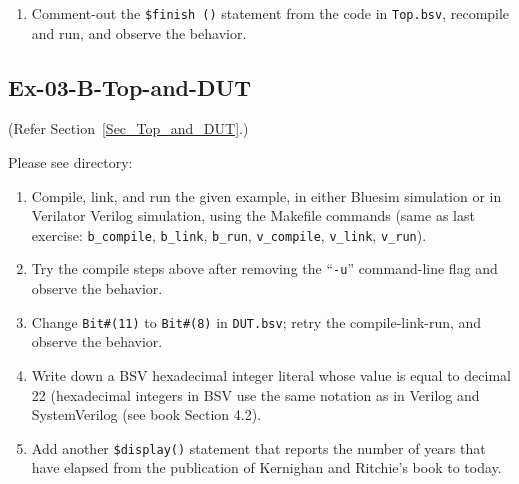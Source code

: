 \begin{enumerate}
    For each of the above ``\verb|make|'' commands, make sure you
    understand what it does, by examining the Makefile, or using the
    \verb|--dry-run| flag like this, or examining the terminal when
    you actually run 'make'.

    \begin{verbatim}
    $ make <target> --dry-run
    \end{verbatim}

    You can also type ``\verb|make b_all|'' to or ``\verb|make v_all|''
    to perform all three actions: compile, link and run (simulate).

    Once you understand these actions, you should be able to create
    your own Makefiles for bsc and Verilator.

  \item Comment-out the \verb|$finish ()| statement from the code in
    \verb|Top.bsv|, recompile and run, and observe the behavior.

\end{enumerate}


\subsection*{Ex-03-B-Top-and-DUT}
\label{Ex-03-B-Top-and-DUT}

(Refer Section~\ref{Sec_Top_and_DUT}.)

Please see directory: 

\begin{enumerate}

  \item Compile, link, and run the given example, in either Bluesim
    simulation or in Verilator Verilog simulation, using the Makefile
    commands (same as last exercise: \verb|b_compile|, \verb|b_link|,
    \verb|b_run|, \verb|v_compile|, \verb|v_link|, \verb|v_run|).

  \item Try the compile steps above after removing the ``\verb|-u|''
    command-line flag and observe the behavior.

  \item Change \verb|Bit#(11)| to \verb|Bit#(8)| in \verb|DUT.bsv|;
    retry the compile-link-run, and observe the behavior.

  \item Write down a BSV hexadecimal integer literal whose value is
    equal to decimal 22 (hexadecimal integers in BSV use the same
    notation as in Verilog and SystemVerilog (see book Section 4.2).

  \item Add another \verb|$display()| statement that reports the
    number of years that have elapsed from the publication of
    Kernighan and Ritchie's book to today.

\end{enumerate}


